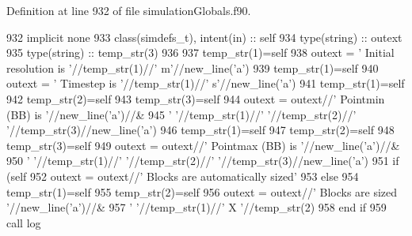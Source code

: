 Definition at line 932 of file simulation\+Globals.\+f90.


\begin{DoxyCode}
932     \textcolor{keywordtype}{implicit none}
933     \textcolor{keywordtype}{class}(simdefs\_t), \textcolor{keywordtype}{intent(in)} :: self
934     \textcolor{keywordtype}{type}(string) :: outext
935     \textcolor{keywordtype}{type}(string) :: temp\_str(3)
936 
937     temp\_str(1)=self%
938     outext = \textcolor{stringliteral}{'      Initial resolution is '}//temp\_str(1)//\textcolor{stringliteral}{' m'}//new\_line(\textcolor{stringliteral}{'a'})
939     temp\_str(1)=self%
940     outext = \textcolor{stringliteral}{'      Timestep is '}//temp\_str(1)//\textcolor{stringliteral}{' s'}//new\_line(\textcolor{stringliteral}{'a'})
941     temp\_str(1)=self%
942     temp\_str(2)=self%
943     temp\_str(3)=self%
944     outext = outext//\textcolor{stringliteral}{'       Pointmin (BB) is '}//new\_line(\textcolor{stringliteral}{'a'})//&
945         \textcolor{stringliteral}{'       '}//temp\_str(1)//\textcolor{stringliteral}{' '}//temp\_str(2)//\textcolor{stringliteral}{' '}//temp\_str(3)//new\_line(\textcolor{stringliteral}{'a'})
946     temp\_str(1)=self%
947     temp\_str(2)=self%
948     temp\_str(3)=self%
949     outext = outext//\textcolor{stringliteral}{'       Pointmax (BB) is '}//new\_line(\textcolor{stringliteral}{'a'})//&
950         \textcolor{stringliteral}{'       '}//temp\_str(1)//\textcolor{stringliteral}{' '}//temp\_str(2)//\textcolor{stringliteral}{' '}//temp\_str(3)//new\_line(\textcolor{stringliteral}{'a'})
951     \textcolor{keywordflow}{if} (self%
952         outext = outext//\textcolor{stringliteral}{'       Blocks are automatically sized'}
953     \textcolor{keywordflow}{else}
954         temp\_str(1)=self%
955         temp\_str(2)=self%
956         outext = outext//\textcolor{stringliteral}{'       Blocks are sized '}//new\_line(\textcolor{stringliteral}{'a'})//&
957             \textcolor{stringliteral}{'       '}//temp\_str(1)//\textcolor{stringliteral}{' X '}//temp\_str(2)
958 \textcolor{keywordflow}{    end if}
959     \textcolor{keyword}{call }log%
\end{DoxyCode}
\mbox{\label{namespacesimulationglobals__mod_ab67964fe7c3fb20a4ce0b4193520aa1d}} 
